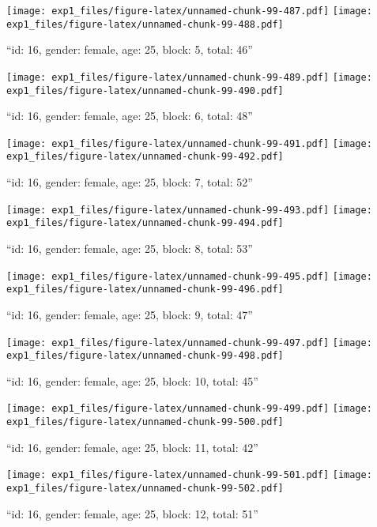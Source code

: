 \documentclass[,]{article}
\begin{document}
\texttt{[image: exp1\_files/figure-latex/unnamed-chunk-99-487.pdf]}
\texttt{[image: exp1\_files/figure-latex/unnamed-chunk-99-488.pdf]}

\newpage
[1] 

``id: 16, gender: female, age: 25, block: 5, total: 46''

\texttt{[image: exp1\_files/figure-latex/unnamed-chunk-99-489.pdf]}
\texttt{[image: exp1\_files/figure-latex/unnamed-chunk-99-490.pdf]}

\newpage
[1] 

``id: 16, gender: female, age: 25, block: 6, total: 48''

\texttt{[image: exp1\_files/figure-latex/unnamed-chunk-99-491.pdf]}
\texttt{[image: exp1\_files/figure-latex/unnamed-chunk-99-492.pdf]}

\newpage
[1] 

``id: 16, gender: female, age: 25, block: 7, total: 52''

\texttt{[image: exp1\_files/figure-latex/unnamed-chunk-99-493.pdf]}
\texttt{[image: exp1\_files/figure-latex/unnamed-chunk-99-494.pdf]}

\newpage
[1] 

``id: 16, gender: female, age: 25, block: 8, total: 53''

\texttt{[image: exp1\_files/figure-latex/unnamed-chunk-99-495.pdf]}
\texttt{[image: exp1\_files/figure-latex/unnamed-chunk-99-496.pdf]}

\newpage
[1] 

``id: 16, gender: female, age: 25, block: 9, total: 47''

\texttt{[image: exp1\_files/figure-latex/unnamed-chunk-99-497.pdf]}
\texttt{[image: exp1\_files/figure-latex/unnamed-chunk-99-498.pdf]}

\newpage
[1] 

``id: 16, gender: female, age: 25, block: 10, total: 45''

\texttt{[image: exp1\_files/figure-latex/unnamed-chunk-99-499.pdf]}
\texttt{[image: exp1\_files/figure-latex/unnamed-chunk-99-500.pdf]}

\newpage
[1] 

``id: 16, gender: female, age: 25, block: 11, total: 42''

\texttt{[image: exp1\_files/figure-latex/unnamed-chunk-99-501.pdf]}
\texttt{[image: exp1\_files/figure-latex/unnamed-chunk-99-502.pdf]}

\newpage
[1] 

``id: 16, gender: female, age: 25, block: 12, total: 51''
\end{document}
